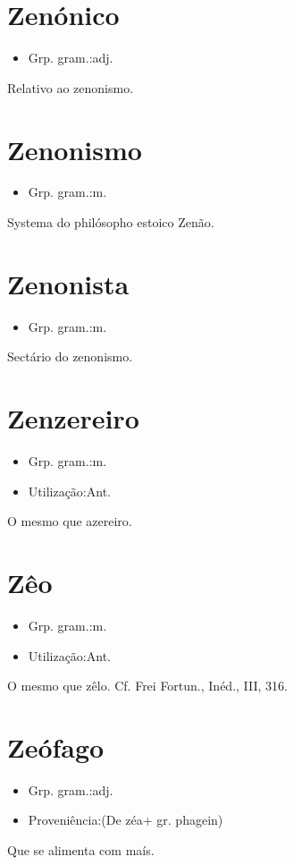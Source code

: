 \section{Zenónico}
\begin{itemize}
\item {Grp. gram.:adj.}
\end{itemize}
Relativo ao zenonismo.
\section{Zenonismo}
\begin{itemize}
\item {Grp. gram.:m.}
\end{itemize}
Systema do philósopho estoico Zenão.
\section{Zenonista}
\begin{itemize}
\item {Grp. gram.:m.}
\end{itemize}
Sectário do zenonismo.
\section{Zenzereiro}
\begin{itemize}
\item {Grp. gram.:m.}
\end{itemize}
\begin{itemize}
\item {Utilização:Ant.}
\end{itemize}
O mesmo que \textunderscore azereiro\textunderscore .
\section{Zêo}
\begin{itemize}
\item {Grp. gram.:m.}
\end{itemize}
\begin{itemize}
\item {Utilização:Ant.}
\end{itemize}
O mesmo que \textunderscore zêlo\textunderscore . Cf. Frei Fortun., \textunderscore Inéd.\textunderscore , III, 316.
\section{Zeófago}
\begin{itemize}
\item {Grp. gram.:adj.}
\end{itemize}
\begin{itemize}
\item {Proveniência:(De \textunderscore zéa\textunderscore  + gr. \textunderscore phagein\textunderscore )}
\end{itemize}
Que se alimenta com maís.
